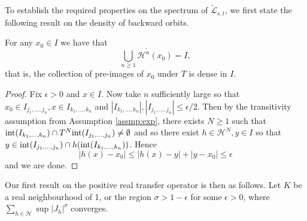 \documentclass[12pt,a4paper,reqno]{amsart}
\begin{document}
To  establish  the  required properties on the spectrum of $\widetilde{\mathcal{L}}_{s,t}$,  we first state the following result on the  density of backward orbits.


\begin{lemma} \label{lem:density}
For any $x_0 \in I$ we have that
\[
\overline{\bigcup_{n \ge 1} \mathcal{H}^n(x_0)} = I,
\]
that is, the collection of pre-images of $x_0$ under $T$ is dense in $I$.
\end{lemma}
\begin{proof}
Fix $\epsilon >0$ and $x \in I$. Now take $n$ sufficiently large so that $x_0 \in I_{j_1,\ldots, j_n}, x \in I_{k_1,\ldots,k_n}$
and $|I_{k_1,\ldots,k_n}|, |I_{j_1,\ldots,j_n}| \le \epsilon/2$. Then by the  transitivity assumption from Assumption \ref{assmp:exp}, there exists $N \ge 1$ such that $\textnormal{int}(I_{k_1,\ldots,k_n}) \cap T^N\textnormal{int}(I_{j_1,\ldots,j_n}) \neq \emptyset$ and so there exist $h \in \mathcal{H}^N, y \in I$ so that $y \in \textnormal{int}( I_{j_1,\ldots,j_n}) \cap h(\textnormal{int}(I_{k_1,\ldots,k_n}))$. Hence 
\[
|h(x) - x_0| \le |h(x) - y| + |y - x_0| \le \epsilon
\]
and we are done.
\end{proof}

Our first result on the positive real transfer operator is then as follows. Let $K$ be a real neighbourhood of 1, or the region $\sigma>1-\epsilon$ for some $\epsilon>0$, where $\sum_{h \in \mathcal{H}} \sup |J_h|^\sigma$ converges.
\end{document}

